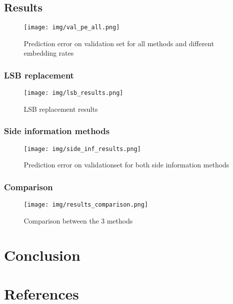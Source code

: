 \documentclass[12pt]{article}
\begin{document}
\subsection{Results}
\begin{figure}[H]
    \texttt{[image: img/val\_pe\_all.png]}
    \caption[Steganalysis results]{Prediction error on validation set for all methods and 
    different embedding rates}
    \label{fig:results}
\end{figure}

\subsubsection{LSB replacement}
\begin{figure}[H]
    \texttt{[image: img/lsb\_results.png]}
    \caption[LSB replacement result]{LSB replacement results}
    \label{fig:lsb_results}
\end{figure}

\subsubsection{Side information methods}
\begin{figure}[H]
    \texttt{[image: img/side\_inf\_results.png]}
    \caption[Side information methods results]{Prediction error on validationset for both side information methods}
    \label{fig:side_inf_results}
\end{figure}

\subsubsection{Comparison}
\begin{figure}[H]
    \texttt{[image: img/results\_comparison.png]}
    \caption[short]{Comparison between the 3 methods}
    \label{fig:results_comparison}
\end{figure}
\section{Conclusion}

\section*{References}
\end{document}
